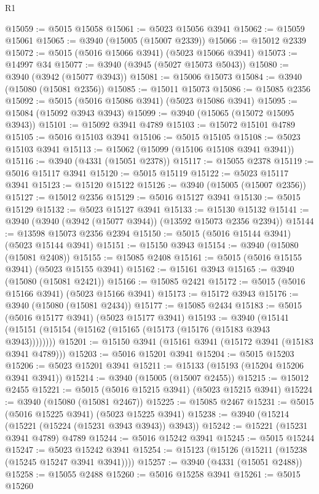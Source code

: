 \begin{lexlean}{R1}
\begin{coremodule}
@15059 := @5015 @15058
@15061 := @5023 @15056 @3941
@15062 := @15059 @15061
@15065 := @3940 (@15005 (@15007 @2339))
@15066 := @15012 @2339
@15072 := @5015 (@5016 @15066 @3941) (@5023 @15066 @3941)
@15073 := @14997 @34
@15077 := @3940 (@3945 (@5027 @15073 @5043))
@15080 := @3940 (@3942 (@15077 @3943))
@15081 := @15006 @15073
@15084 := @3940 (@15080 (@15081 @2356))
@15085 := @15011 @15073
@15086 := @15085 @2356
@15092 := @5015 (@5016 @15086 @3941) (@5023 @15086 @3941)
@15095 := @15084 (@15092 @3943 @3943)
@15099 := @3940 (@15065 (@15072 @15095 @3943))
@15101 := @15092 @3941 @4789
@15103 := @15072 @15101 @4789
@15105 := @5016 @15103 @3941
@15106 := @5015 @15105
@15108 := @5023 @15103 @3941
@15113 := @15062 (@15099 (@15106 @15108 @3941 @3941))
@15116 := @3940 (@4331 (@15051 @2378))
@15117 := @15055 @2378
@15119 := @5016 @15117 @3941
@15120 := @5015 @15119
@15122 := @5023 @15117 @3941
@15123 := @15120 @15122
@15126 := @3940 (@15005 (@15007 @2356))
@15127 := @15012 @2356
@15129 := @5016 @15127 @3941
@15130 := @5015 @15129
@15132 := @5023 @15127 @3941
@15133 := @15130 @15132
@15141 := @3940 (@3940 (@3942 (@15077 @3944)) (@13592 @15073 @2356 @2394))
@15144 := @13598 @15073 @2356 @2394
@15150 := @5015 (@5016 @15144 @3941) (@5023 @15144 @3941)
@15151 := @15150 @3943
@15154 := @3940 (@15080 (@15081 @2408))
@15155 := @15085 @2408
@15161 := @5015 (@5016 @15155 @3941) (@5023 @15155 @3941)
@15162 := @15161 @3943
@15165 := @3940 (@15080 (@15081 @2421))
@15166 := @15085 @2421
@15172 := @5015 (@5016 @15166 @3941) (@5023 @15166 @3941)
@15173 := @15172 @3943
@15176 := @3940 (@15080 (@15081 @2434))
@15177 := @15085 @2434
@15183 := @5015 (@5016 @15177 @3941) (@5023 @15177 @3941)
@15193 := @3940 (@15141 (@15151 (@15154 (@15162 (@15165 (@15173 (@15176 (@15183 @3943 @3943))))))))
@15201 := @15150 @3941 (@15161 @3941 (@15172 @3941 (@15183 @3941 @4789)))
@15203 := @5016 @15201 @3941
@15204 := @5015 @15203
@15206 := @5023 @15201 @3941
@15211 := @15133 (@15193 (@15204 @15206 @3941 @3941))
@15214 := @3940 (@15005 (@15007 @2455))
@15215 := @15012 @2455
@15221 := @5015 (@5016 @15215 @3941) (@5023 @15215 @3941)
@15224 := @3940 (@15080 (@15081 @2467))
@15225 := @15085 @2467
@15231 := @5015 (@5016 @15225 @3941) (@5023 @15225 @3941)
@15238 := @3940 (@15214 (@15221 (@15224 (@15231 @3943 @3943)) @3943))
@15242 := @15221 (@15231 @3941 @4789) @4789
@15244 := @5016 @15242 @3941
@15245 := @5015 @15244
@15247 := @5023 @15242 @3941
@15254 := @15123 (@15126 (@15211 (@15238 (@15245 @15247 @3941 @3941))))
@15257 := @3940 (@4331 (@15051 @2488))
@15258 := @15055 @2488
@15260 := @5016 @15258 @3941
@15261 := @5015 @15260

\end{coremodule}
\end{lexlean}
